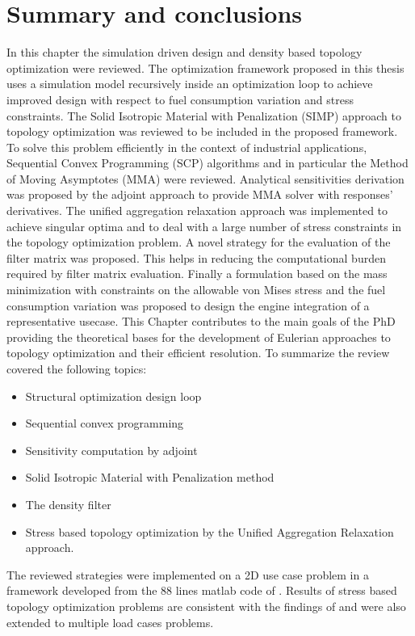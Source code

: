  \section{Summary and conclusions}
In this chapter the simulation driven design and density based topology optimization were reviewed. The optimization framework proposed in this thesis uses a simulation model recursively inside an optimization loop to achieve improved design with respect to fuel consumption variation and stress constraints. The Solid Isotropic Material with Penalization (SIMP) approach to topology optimization was reviewed to be included in the proposed framework. To solve this problem efficiently in the context of industrial applications, Sequential Convex Programming (SCP) algorithms and in particular the Method of Moving Asymptotes (MMA) were reviewed. Analytical sensitivities derivation was proposed by the adjoint approach to provide MMA solver with responses' derivatives. The unified aggregation relaxation approach was implemented to achieve singular optima and to deal with a large number of stress constraints in the topology optimization problem. A novel strategy for the evaluation of the filter matrix was proposed. This helps in reducing the computational burden required by filter matrix evaluation. Finally a formulation based on the mass minimization with constraints on the allowable von Mises stress and the fuel consumption variation was proposed to design the engine integration of a representative usecase.
This Chapter contributes to the main goals of the PhD providing the theoretical bases for the development of Eulerian approaches to topology optimization and their efficient resolution.
To summarize the review covered the following topics:
\begin{itemize}
\item Structural optimization design loop
\item Sequential convex programming
\item Sensitivity computation by adjoint
\item Solid Isotropic Material with Penalization method
\item The density filter
\item Stress based topology optimization by the Unified Aggregation Relaxation approach.
\end{itemize}
The reviewed strategies were implemented on a 2D use case problem in a framework developed from the 88 lines matlab code of \cite{andreassen2011efficient}. Results of stress based topology optimization problems are consistent with the findings of \cite{verbart2017unified} and were also extended to multiple load cases problems.
